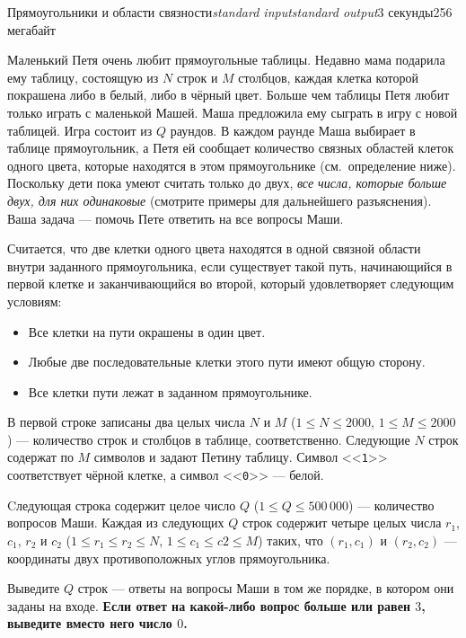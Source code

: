 \begin{problem}{Прямоугольники и области связности}{\textsl{standard input}}{\textsl{standard output}}{3 секунды}{256 мегабайт}

Маленький Петя очень любит прямоугольные таблицы. Недавно мама подарила ему таблицу, состоящую из $N$ строк и $M$ столбцов, каждая клетка которой покрашена либо в белый, либо в чёрный цвет. Больше чем таблицы Петя любит только играть с маленькой Машей. Маша предложила ему сыграть в игру с новой таблицей. Игра состоит из $Q$ раундов. В каждом раунде Маша выбирает в таблице прямоугольник, а Петя ей сообщает количество связных областей клеток одного цвета, которые находятся в этом прямоугольнике (см.~определение ниже). Поскольку дети пока умеют считать только до двух, \emph{все числа, которые больше двух, для них одинаковые} (смотрите примеры для дальнейшего разъяснения). Ваша задача --- помочь Пете ответить на все вопросы Маши.

Считается, что две клетки одного цвета находятся в одной связной области внутри заданного прямоугольника, если существует такой путь, начинающийся в первой клетке и заканчивающийся во второй, который удовлетворяет следующим условиям:
\begin{itemize}
\item Все клетки на пути окрашены в один цвет.
\item Любые две последовательные клетки этого пути имеют общую сторону.
\item Все клетки пути лежат в заданном прямоугольнике.
\end{itemize}

\InputFile
В первой строке записаны два целых числа $N$ и $M$ ($1 \le N \le 2000$, $1 \le M \le 2000$) --- количество строк и столбцов в таблице, соответственно. Следующие $N$ строк содержат по $M$ символов и задают Петину таблицу. Символ <<\texttt{1}>> соответствует чёрной клетке, а символ <<\texttt{0}>> --- белой.

Cледующая строка содержит целое число $Q$ ($1 \le Q \le 500\,000$) --- количество вопросов Маши. Каждая из следующих $Q$ строк содержит четыре целых числа $r_1$, $c_1$, $r_2$ и $c_2$ ($1 \le r_1 \le r_2 \le N$, $1 \le c_1 \le c2 \le M$) таких, что $(r_1, c_1)$ и $(r_2, c_2)$ --- координаты двух противоположных углов прямоугольника.

\OutputFile
Выведите $Q$ строк --- ответы на вопросы Маши в том же порядке, в котором они заданы на входе. \textbf{Если ответ на какой-либо вопрос больше или равен $3$, выведите вместо него число $0$.}

\Examples

\begin{example}
%
%
\end{example}

\end{problem}
